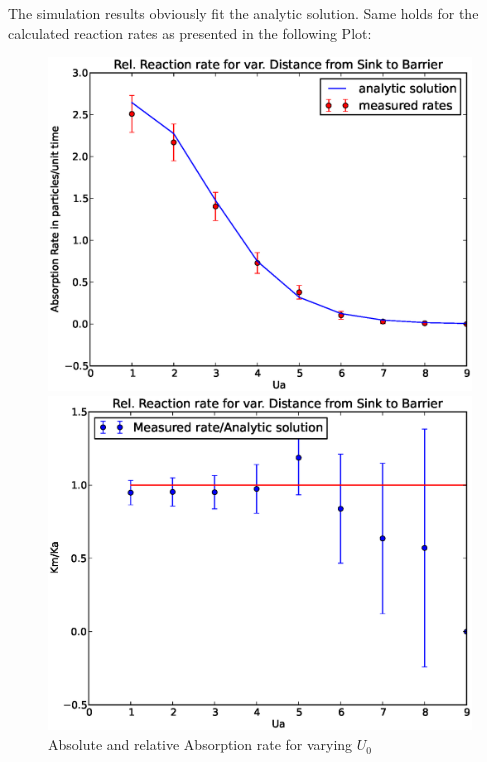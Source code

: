 The simulation results obviously fit the analytic solution. Same holds for the calculated reaction rates as presented in the following Plot:
\begin{figure}[H]
\centering
\begin{minipage}{.5 \textwidth}
    \centering
    \includegraphics[width=.95 \textwidth, keepaspectratio]{plots/cp/uo/Kabs.eps}
\end{minipage}\begin{minipage}{.5 \textwidth}
    \includegraphics[width=.95 \textwidth, keepaspectratio]{plots/cp/uo/Krel.eps}
\end{minipage}
\caption{Absolute and relative Absorption rate for varying $U_0$}
\label{fig:KU0Cp}
\end{figure}


